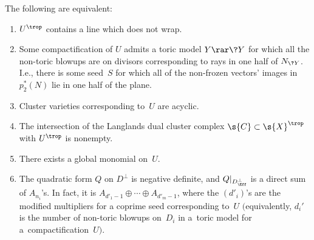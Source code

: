 \begin{thm}\label{not-all-wrap}
The following are equivalent:
\begin{enumerate}\itemsep=0pt
\item[$1.$] $U^{\trop}$ contains a {line} which does not wrap.
\item[$2.$] Some compactification of $U$ admits a toric model $Y\rar \?{Y}$ for which all the non-toric blowups are on divisors corresponding to rays in one half of $N_{\?{Y}}$. I.e., there is some seed~$S$ for which all of the non-frozen vectors' images in~$p_2^*(N)$ lie in one half of the plane.
\item[$3.$] Cluster varieties corresponding to~$U$ are {acyclic}.
\item[$4.$] The intersection of the Langlands dual {cluster complex} $\s{C}\subset \s{X}^{\trop}$ with $U^{\trop}$ is non\-empty.
\item[$5.$] There exists a {global monomial} on~$U$.
\item[$6.$] The {quadratic form} $Q$ on $D^{\perp}$ is negative definite, and $Q|_{D^{\perp}_{\Eff}}$ is a direct sum of $A_{n_i}$'s. In fact, it is $A_{d'_1-1}\oplus \cdots \oplus A_{d'_m-1}$, where the $(d'_i)$'s are the modified multipliers for a coprime seed corresponding to~$U$ $($equivalently, $d_i'$ is the number of non-toric blowups on~$D_i$ in a~toric model for a~compactification~$U)$.
\end{enumerate}
\end{thm}
